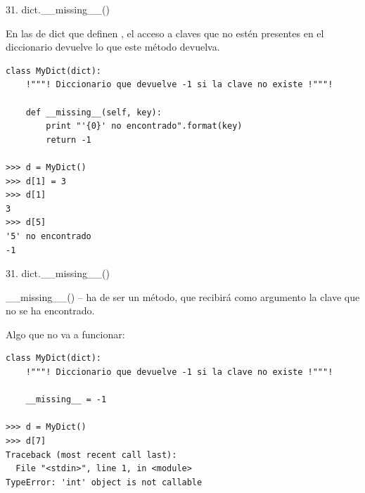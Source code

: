 \documentclass[14pt]{beamer}
\begin{document}
\begin{frame}[fragile]{31. dict.\_\_missing\_\_()}
  \small
  \begin{block}{}
    \centering
    En las  de dict que definen
    , el acceso a claves que no estén
    presentes en el diccionario devuelve lo que este método devuelva.
  \end{block}

  \scriptsize
  \begin{exampleblock}{}
    \begin{lstlisting}[escapechar=!]
class MyDict(dict):
    !"""! Diccionario que devuelve -1 si la clave no existe !"""!

    def __missing__(self, key):
        print "'{0}' no encontrado".format(key)
        return -1

>>> d = MyDict()
>>> d[1] = 3
>>> d[1]
3
>>> d[5]
'5' no encontrado
-1
    \end{lstlisting}
  \end{exampleblock}
\end{frame}

\begin{frame}[fragile]{31. dict.\_\_missing\_\_()}
  \small
  \begin{alertblock}{}
    \centering
    \_\_missing\_\_()  -- ha de ser un
    método, que recibirá como argumento la clave que no se ha
    encontrado.
  \end{alertblock}

  \scriptsize
  \begin{exampleblock}
    {\footnotesize Algo que no va a funcionar:}
    \begin{lstlisting}[escapechar=!]
class MyDict(dict):
    !"""! Diccionario que devuelve -1 si la clave no existe !"""!

    __missing__ = -1

>>> d = MyDict()
>>> d[7]
Traceback (most recent call last):
  File "<stdin>", line 1, in <module>
TypeError: 'int' object is not callable
    \end{lstlisting}
  \end{exampleblock}
\end{frame}
\end{document}
